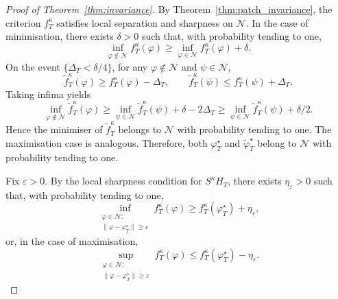 \documentclass[12pt]{article}
\numberwithin{equation}{section}
\begin{document}
\begin{proof}[Proof of Theorem~\ref{thm:invariance}]
By Theorem~\ref{thm:patch_invariance}, the criterion $f_T^\kappa$ satisfies local separation and sharpness on $\mathcal N$. In the case of minimisation, there exists $\delta>0$ such that, with probability tending to one,
\begin{equation}
\inf_{\varphi\notin\mathcal N} f_T^\kappa(\varphi)
\ge
\inf_{\varphi\in\mathcal N} f_T^\kappa(\varphi)+\delta.
\end{equation}
On the event $\{\Delta_T<\delta/4\}$, for any $\varphi\notin\mathcal N$ and $\psi\in\mathcal N$,
\begin{equation}
\tilde f_T^\kappa(\varphi)\ge f_T^\kappa(\varphi)-\Delta_T,
\qquad
\tilde f_T^\kappa(\psi)\le f_T^\kappa(\psi)+\Delta_T.
\end{equation}
Taking infima yields
\begin{equation}
\inf_{\varphi\notin\mathcal N} \tilde f_T^\kappa(\varphi)
\ge
\inf_{\psi\in\mathcal N} \tilde f_T^\kappa(\psi)+\delta-2\Delta_T
\ge
\inf_{\psi\in\mathcal N} \tilde f_T^\kappa(\psi)+\delta/2.
\end{equation}
Hence the minimiser of $\tilde f_T^\kappa$ belongs to $\mathcal N$ with probability tending to one. The maximisation case is analogous. Therefore, both $\varphi_T^\star$ and $\tilde{\varphi}_T^\star$ belong to $\mathcal N$ with probability tending to one.

Fix $\varepsilon>0$. By the local sharpness condition for $S^\kappa H_T$, there exists $\eta_\varepsilon>0$ such that, with probability tending to one,
\begin{equation}
\inf_{\substack{\varphi\in\mathcal N:\\
\|\varphi-\varphi_T^\star\|\ge\varepsilon}}
f_T^\kappa(\varphi)
\ge
f_T^\kappa(\varphi_T^\star)+\eta_\varepsilon,
\end{equation}
or, in the case of maximisation,
\begin{equation}
\sup_{\substack{\varphi\in\mathcal N:\\
\|\varphi-\varphi_T^\star\|\ge\varepsilon}}
f_T^\kappa(\varphi)
\le
f_T^\kappa(\varphi_T^\star)-\eta_\varepsilon.
\end{equation}


\end{proof}
\end{document}
